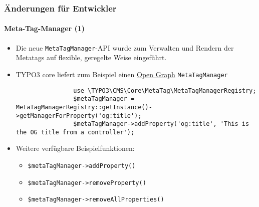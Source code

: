
\begin{frame}[fragile]
	\frametitle{Änderungen für Entwickler}
	\framesubtitle{Meta-Tag-Manager (1)}

	\lstset{basicstyle=\tiny\ttfamily}

	\begin{itemize}
		\item Die neue \texttt{MetaTagManager}-API wurde zum Verwalten und Rendern der 
			Metatags auf flexible, geregelte Weise eingeführt.
		\item TYPO3 core liefert zum Beispiel einen \href{http://ogp.me/}{Open Graph}
			\texttt{MetaTagManager}

			\begin{lstlisting}
				use \TYPO3\CMS\Core\MetaTag\MetaTagManagerRegistry;
				$metaTagManager = MetaTagManagerRegistry::getInstance()->getManagerForProperty('og:title');
				$metaTagManager->addProperty('og:title', 'This is the OG title from a controller');
			\end{lstlisting}

		\item Weitere verfügbare Beispielfunktionen:

			\begin{itemize}
				\smaller
					\item \texttt{\$metaTagManager->addProperty()}
					\item \texttt{\$metaTagManager->removeProperty()}
					\item \texttt{\$metaTagManager->removeAllProperties()}
			\end{itemize}

	\end{itemize}

\end{frame}


